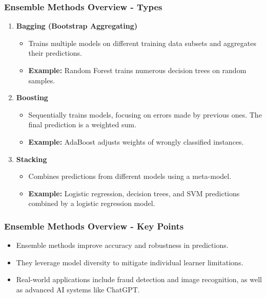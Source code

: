 \documentclass[aspectratio=169]{beamer}
\begin{document}
\begin{frame}[fragile]
    \frametitle{Ensemble Methods Overview - Types}
    \begin{enumerate}
        \item \textbf{Bagging (Bootstrap Aggregating)}
            \begin{itemize}
                \item Trains multiple models on different training data subsets and aggregates their predictions.
                \item \textbf{Example:} Random Forest trains numerous decision trees on random samples.
            \end{itemize}
        
        \item \textbf{Boosting}
            \begin{itemize}
                \item Sequentially trains models, focusing on errors made by previous ones. The final prediction is a weighted sum.
                \item \textbf{Example:} AdaBoost adjusts weights of wrongly classified instances.
            \end{itemize}

        \item \textbf{Stacking}
            \begin{itemize}
                \item Combines predictions from different models using a meta-model.
                \item \textbf{Example:} Logistic regression, decision trees, and SVM predictions combined by a logistic regression model.
            \end{itemize}
    \end{enumerate}
\end{frame}

\begin{frame}[fragile]
    \frametitle{Ensemble Methods Overview - Key Points}
    \begin{itemize}
        \item Ensemble methods improve accuracy and robustness in predictions.
        \item They leverage model diversity to mitigate individual learner limitations.
        \item Real-world applications include fraud detection and image recognition, as well as advanced AI systems like ChatGPT.
    \end{itemize}
\end{frame}
\end{document}
